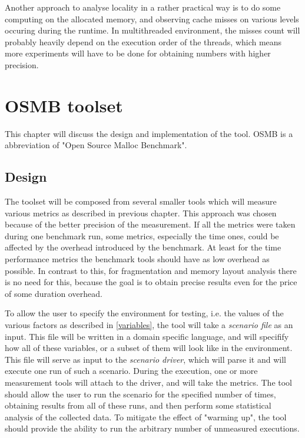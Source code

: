 Another approach to analyse locality in a rather practical way is to do some
computing on the allocated memory, and observing cache misses on various levels
occuring during the runtime. In multithreaded environment, the misses count will
probably heavily depend on the execution order of the threads, which means more
experiments will have to be done for obtaining numbers with higher precision.

\chapter{OSMB toolset}

This chapter will discuss the design and implementation of the tool. OSMB is a
abbreviation of "Open Source Malloc Benchmark".

\section{Design}

The toolset will be composed from several smaller tools which will measure
various metrics as described in previous chapter. This approach was chosen
because of the better precision of the measurement. If all the metrics were taken
during one benchmark run, some metrics, especially the time ones, could be
affected by the overhead introduced by the benchmark. At least for the time
performance metrics the benchmark tools should have as low overhead as possible.
In contrast to this, for fragmentation and memory layout analysis there is no
need for this, because the goal is to obtain precise results even for the price
of some duration overhead.

To allow the user to specify the environment for testing, i.e. the values of the
various factors as described in \ref{variables}, the tool will take a {\em
scenario file} as an input. This file will be written in a domain specific
language, and will specifify how all of these variables, or a subset of them will
look like in the environment. This file will serve as input to the {\em scenario
driver}, which will parse it and will execute one run of such a scenario. During
the execution, one or more measurement tools will attach to the driver, and will
take the metrics. The tool should allow the user to run the scenario for the
specified number of times, obtaining results from all of these runs, and then
perform some statistical analysis of the collected data. To mitigate the effect
of "warming up", the tool should provide the ability to run the arbitrary number
of unmeasured executions.

